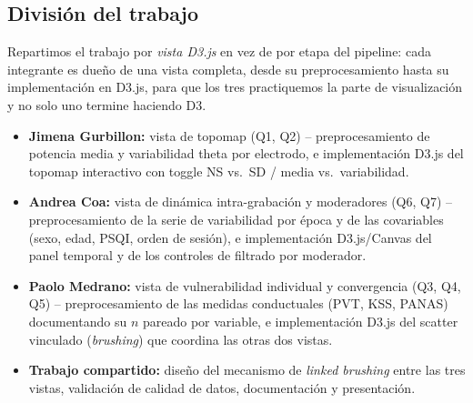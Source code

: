 \documentclass[10pt]{article}
\begin{document}
\subsection*{División del trabajo}
Repartimos el trabajo por \emph{vista D3.js} en vez de por etapa del pipeline: cada integrante es dueño de una vista completa, desde su preprocesamiento hasta su implementación en D3.js, para que los tres practiquemos la parte de visualización y no solo uno termine haciendo D3.
\begin{itemize}
    \item \textbf{Jimena Gurbillon:} vista de topomap (Q1, Q2) -- preprocesamiento de potencia media y variabilidad theta por electrodo, e implementación D3.js del topomap interactivo con toggle NS vs.\ SD / media vs.\ variabilidad.
    \item \textbf{Andrea Coa:} vista de dinámica intra-grabación y moderadores (Q6, Q7) -- preprocesamiento de la serie de variabilidad por época y de las covariables (sexo, edad, PSQI, orden de sesión), e implementación D3.js/Canvas del panel temporal y de los controles de filtrado por moderador.
    \item \textbf{Paolo Medrano:} vista de vulnerabilidad individual y convergencia (Q3, Q4, Q5) -- preprocesamiento de las medidas conductuales (PVT, KSS, PANAS) documentando su $n$ pareado por variable, e implementación D3.js del scatter vinculado (\emph{brushing}) que coordina las otras dos vistas.
    \item \textbf{Trabajo compartido:} diseño del mecanismo de \emph{linked brushing} entre las tres vistas, validación de calidad de datos, documentación y presentación.
\end{itemize}
\end{document}
